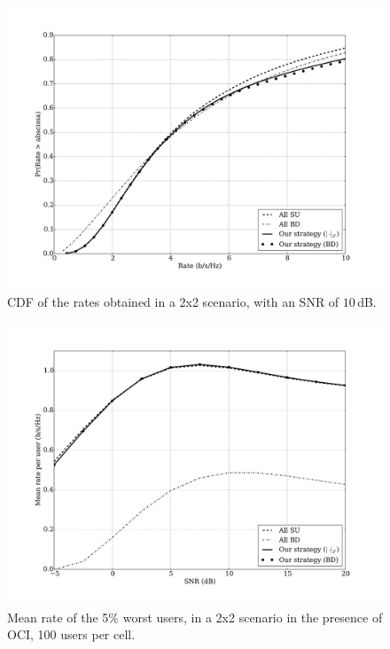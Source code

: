 \begin{figure}[t]
\centering
\includegraphics[width=0.75\columnwidth]{./12.simple_threshold_scheduling/figure/cdf_02x02_s20_100user_bd} \caption{CDF of the rates obtained in a 2x2 scenario, with an SNR of $10$\,dB.}
\label{fig:cdf_snr10}
\end{figure}

\begin{figure}[t]
\centering
\includegraphics[width=0.75\columnwidth]{./12.simple_threshold_scheduling/figure/mean_rate_005_worst_02x02_100user_bd} \caption{Mean rate of the 5\% worst users, in a 2x2 scenario in the presence of OCI, 100 users per cell.}
\label{fig:worst_rate}
\end{figure}
